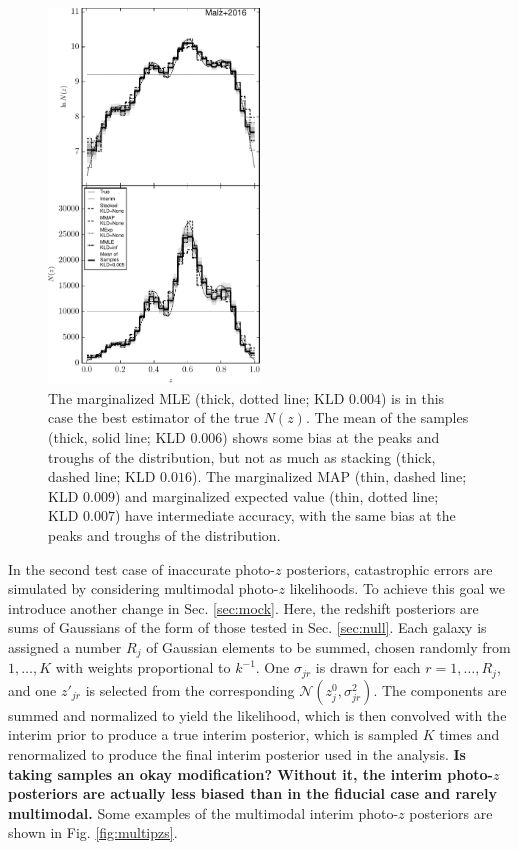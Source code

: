 \documentclass[preprint]{aastex}
\begin{document}
\begin{figure}
\includegraphics[width=0.5\textwidth]{figs/vars/comps.pdf}
\caption{The marginalized MLE (thick, dotted line; KLD $0.004$) is in this case 
the best estimator of the true $N(z)$.  The mean of the samples (thick, solid 
line; KLD $0.006$) shows some bias at the peaks and troughs of the 
distribution, but not as much as stacking (thick, dashed line; KLD $0.016$).  
The marginalized MAP (thin, dashed line; KLD $0.009$) and marginalized expected 
value (thin, dotted line; KLD $0.007$) have intermediate accuracy, with the 
same bias at the peaks and troughs of the distribution.}
\label{fig:noisy-comp}
\end{figure}

In the second test case of inaccurate photo-$z$ posteriors, catastrophic errors 
are simulated by considering multimodal photo-$z$ likelihoods.  To achieve this 
goal we introduce another change in Sec. \ref{sec:mock}.  Here, the redshift 
posteriors are sums of Gaussians of the form of those tested in Sec. 
\ref{sec:null}.  Each galaxy is assigned a number $R_{j}$ of Gaussian elements 
to be summed, chosen randomly from $1,\dots,K$ with weights proportional to 
$k^{-1}$.  One $\sigma_{jr}$ is drawn for each $r=1,\dots,R_{j}$, and one 
$z'_{jr}$ is selected from the corresponding 
$\mathcal{N}(z^{0}_{j},\sigma^{2}_{jr})$.  The components are summed and 
normalized to yield the likelihood, which is then convolved with the interim 
prior to produce a true interim posterior, which is sampled $K$ times and 
renormalized to produce the final interim posterior used in the analysis.  
\textbf{Is taking samples an okay modification?  Without it, the interim 
photo-$z$ posteriors are actually less biased than in the fiducial case and 
rarely multimodal.}  Some examples of the multimodal interim photo-$z$ 
posteriors are shown in Fig. \ref{fig:multipzs}.  
\end{document}
